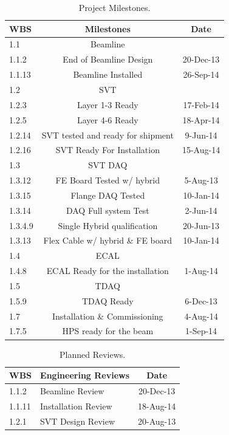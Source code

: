 \begin{table}[htdp]
\caption{Project Milestones.}
\begin{center}
\begin{tabular}{|l|c|c|}
\hline
WBS & Milestones & Date\\
\hline\hline
1.1	&Beamline	&\\
\hline
1.1.2	&End of Beamline Design	&20-Dec-13\\
\hline
1.1.13	&Beamline Installed	&26-Sep-14\\
\hline
1.2	&SVT	&\\
\hline
1.2.3	&Layer 1-3 Ready	&17-Feb-14\\
\hline
1.2.5	&Layer 4-6 Ready	&18-Apr-14\\
\hline
1.2.14	&SVT tested and ready for shipment	&9-Jun-14\\
\hline
1.2.16	&SVT Ready For Installation	&15-Aug-14\\
\hline
1.3	&SVT DAQ	&\\
\hline
1.3.12	&FE Board Tested w/ hybrid	&5-Aug-13\\
\hline
1.3.15	&Flange DAQ Tested	&10-Jan-14\\
\hline
1.3.14	&DAQ Full system Test	&2-Jun-14\\
\hline
1.3.4.9	&Single Hybrid qualification	&20-Jun-13\\
\hline
1.3.13	&Flex Cable w/ hybrid \& FE board	&10-Jan-14\\
\hline
1.4	& ECAL	&\\
\hline
1.4.8	&ECAL Ready for the installation	&1-Aug-14\\
\hline
1.5	&TDAQ	&\\
\hline
1.5.9	&TDAQ Ready	&6-Dec-13\\
\hline
1.7	&Installation \& Commissioning	&4-Aug-14\\
\hline
1.7.5	&HPS ready for the beam	&1-Sep-14\\
\hline
\hline
\end{tabular}
\end{center}
\label{tb:milestones}
\end{table}%

\begin{table}[htdp]
\caption{Planned Reviews.}
\begin{center}
\begin{tabular}{|l|l|c|}
\hline
WBS&Engineering Reviews& Date\\
\hline
\hline
1.1.2 &	Beamline Review&	20-Dec-13\\
\hline
1.1.11&	Installation Review	&18-Aug-14\\
\hline
1.2.1	&SVT Design Review	&20-Aug-13\\
\hline
\hline
\end{tabular}
\end{center}
\label{tb:reviews}
\end{table}%

